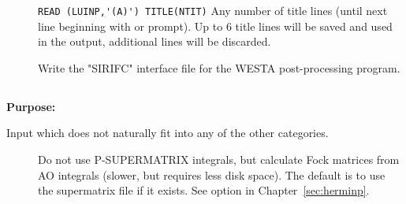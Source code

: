 \begin{description}
\item[] 
  \verb"READ (LUINP,'(A)') TITLE(NTIT)" 
  Any number of title lines (until next line beginning with
   or \quotekw{*} prompt).
  Up to 6 title lines will be saved and used in the output, additional
  lines will be discarded.

\item[]
  Write the "SIRIFC" interface file for the WESTA post-processing program.

\end{description}




\pagebreak[3]
\subsection{\label{ref-auxinp}}

{\bf Purpose:}

Input which does not naturally fit into any of the other
categories.

\begin{description}
\item[]
  Do not use P-SUPERMATRIX integrals, but calculate Fock matrices
  from AO integrals (slower, but requires less disk space). The
  default is to use the supermatrix file if it exists. See option
   in Chapter~\ref{sec:herminp}.

\end{description}

